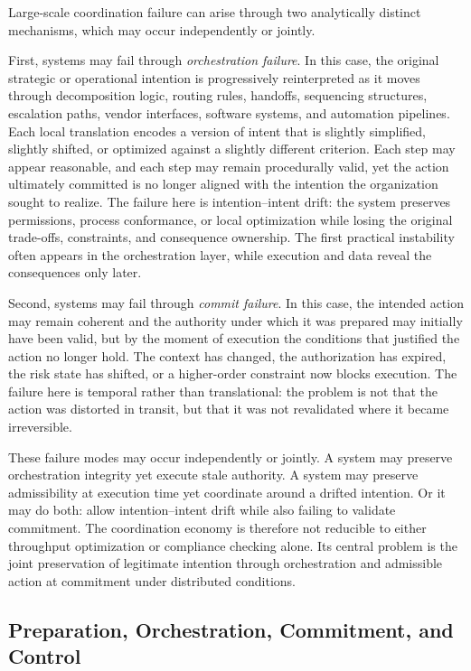 \documentclass[12pt]{article}
\begin{document}
Large-scale coordination failure can arise through two analytically distinct
mechanisms, which may occur independently or jointly.

First, systems may fail through \textit{orchestration failure}. In this case,
the original strategic or operational intention is progressively reinterpreted
as it moves through decomposition logic, routing rules, handoffs, sequencing
structures, escalation paths, vendor interfaces, software systems, and
automation pipelines. Each local translation encodes a version of intent that
is slightly simplified, slightly shifted, or optimized against a slightly
different criterion. Each step may appear reasonable, and each step may remain
procedurally valid, yet the action ultimately committed is no longer aligned
with the intention the organization sought to realize. The failure here is
intention--intent drift: the system preserves permissions, process
conformance, or local optimization while losing the original trade-offs,
constraints, and consequence ownership. The first practical instability often
appears in the orchestration layer, while execution and data reveal the
consequences only later.

Second, systems may fail through \textit{commit failure}. In this case, the
intended action may remain coherent and the authority under which it was
prepared may initially have been valid, but by the moment of execution the
conditions that justified the action no longer hold. The context has changed,
the authorization has expired, the risk state has shifted, or a higher-order
constraint now blocks execution. The failure here is temporal rather than
translational: the problem is not that the action was distorted in transit,
but that it was not revalidated where it became irreversible.

These failure modes may occur independently or jointly. A system may preserve
orchestration integrity yet execute stale authority. A system may preserve
admissibility at execution time yet coordinate around a drifted intention.
Or it may do both: allow intention--intent drift while also failing to validate
commitment. The coordination economy is therefore not reducible to either
throughput optimization or compliance checking alone. Its central problem is
the joint preservation of legitimate intention through orchestration and
admissible action at commitment under distributed conditions.

\subsection{Preparation, Orchestration, Commitment, and Control}
\end{document}
